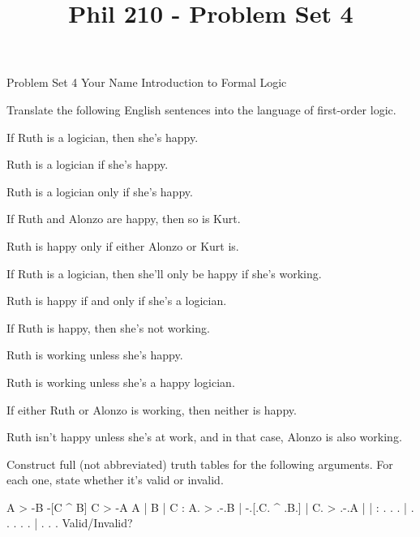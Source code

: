 
\title{Phil 210 - Problem Set 4}

\heading
Problem Set 4
Your Name
Introduction to Formal Logic
\endheading

Translate the following English sentences into the language of first-order logic.

\problems
{}
If Ruth is a logician, then she's happy.
        \answer
        $ $
        \endanswer

Ruth is a logician if she's happy.
        \answer
        $ $
        \endanswer

Ruth is a logician only if she's happy.
        \answer
        $ $
        \endanswer

If Ruth and Alonzo are happy, then so is Kurt.
        \answer
        $ $
        \endanswer

Ruth is happy only if either Alonzo or Kurt is.
        \answer
        $ $
        \endanswer

If Ruth is a logician, then she'll only be happy if she's working.
        \answer
        $ $
        \endanswer

Ruth is happy if and only if she's a logician.
        \answer
        $ $
        \endanswer

If Ruth is happy, then she's not working.
        \answer
        $ $
        \endanswer

Ruth is working unless she's happy.
        \answer
        $ $
        \endanswer

Ruth is working unless she's a happy logician.
        \answer
        $ $
        \endanswer

If either Ruth or Alonzo is working, then neither is happy.
        \answer
        $ $
        \endanswer

Ruth isn't happy unless she's at work, and in that case, Alonzo is also working.
        \answer
        $ $
        \endanswer

\endproblems

Construct full (not abbreviated) truth tables for the following arguments. For each one, state whether it's valid or invalid.

\problems
{}
\argument
 A > -B
 -[C ^ B]
\argumentline
 C > -A
\endargument
        \answer
        \truthtable
         A | B | C : A. > .-.B | -.[.C. ^ .B.] | C. > .-.A
        \truthtableline
           |   |   :  .   . .  |  . . .   . .  |  .   . . 
        \endtruthtable
        Valid/Invalid?
        \endanswer

